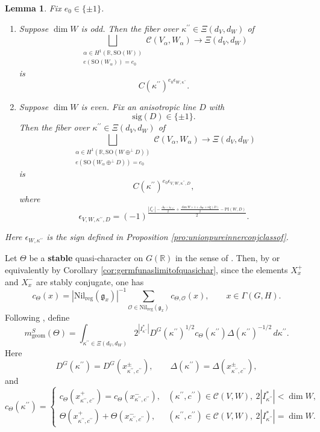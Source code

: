 \documentclass[12pt]{amsart}
\numberwithin{equation}{subsection}
\newcommand{\BR}{{\mathbb {R}}}
\newcommand{\CC}{{\mathcal {C}}}
\newcommand{\CO}{{\mathcal {O}}}
\newcommand{\Fg}{{\mathfrak {g}}}
\newcommand{\Fi}{{\mathfrak {i}}}
\newcommand{\reg}{{\mathrm{reg}}}
\newcommand{\SO}{{\mathrm{SO}}}
\def\alp{{\alpha}}
\def\Del{{\Delta}}
\def\eps{{\epsilon}}
\def\nil{\mathrm{Nil}}
\def\Gam{{\Gamma}}
\def\p{\prime}
\def\geom{\mathrm{geom}}
\def\PI{\mathrm{PI}}
\def\SO{\mathrm{SO}}
\newtheorem{lem}[thm]{Lemma}
\begin{document}
\begin{lem}\label{lem:fiberoverkappappunionoverpure}
Fix $e_0\in \{\pm 1\}$.

\begin{enumerate}
\item Suppose $\dim W$ is odd. Then the fiber over
$\kappa^{\p\p}\in \Xi(d_V,d_W)$ of
\[
\bigsqcup_{\substack{
\alp\in H^1(\BR,\SO(W))\\
e(\SO(W_\alp))=e_0
}}
\CC(V_\alp,W_\alp)
\longrightarrow
\Xi(d_V,d_W)
\]
is
\[
C(\kappa^{\p\p})^{e_0\eps_{W,\kappa^{\p\p}}}.
\]

\item Suppose $\dim W$ is even. Fix an anisotropic line $D$ with
\[
\mathrm{sig}(D)\in \{\pm 1\}.
\]
Then the fiber over $\kappa^{\p\p}\in \Xi(d_V,d_W)$ of
\[
\bigsqcup_{\substack{
\alp\in H^1(\BR,\SO(W\oplus^\perp D))\\
e(\SO(W_\alp\oplus^\perp D))=e_0
}}
\CC(V_\alp,W_\alp)
\longrightarrow
\Xi(d_V,d_W)
\]
is
\[
C(\kappa^{\p\p})^{e_0\eps_{V,W,\kappa^{\p\p},D}},
\]
where
\[
\eps_{V,W,\kappa^{\p\p},D}
=
(-1)^{
\frac{
|I^*_{\kappa^{\p\p}}|
-
\frac{\Del_V-\Fi_{V,\kappa^{\p\p}}}{2}
+
\frac{\dim W+1+\Del_W+\mathrm{sig}(D)}{2}
-
\PI(W,D)
}{2}
}.
\]
\end{enumerate}
Here $\eps_{W,\kappa^{\p\p}}$ is the sign defined in Proposition
\ref{pro:unionpureinnerconjclassof}.
\end{lem}

Let $\Theta$ be a \textbf{stable} quasi-character on $G(\BR)$ in the sense of
\cite[\S 12.1]{beuzart2015local}. Then, by \cite[(10.1.2)]{thesis_zhilin} or
equivalently by Corollary \ref{cor:germfunaslimitofquasichar}, since the
elements $X_x^+$ and $X_x^-$ are stably conjugate, one has
\[
c_\Theta(x)
=
|\nil_\reg(\Fg_x)|^{-1}
\sum_{\CO\in \nil_\reg(\Fg_x)}
c_{\Theta,\CO}(x),
\qquad x\in \Gam(G,H).
\]
Following \cite[\S 3.2]{MR3155345}, define
\begin{equation}\label{eq:stablegeomultiplicity}
m_\geom^S(\Theta)
=
\int_{\kappa^{\p\p}\in \Xi(d_V,d_W)}
2^{|I^*_{\kappa^{\p\p}}|}
D^G(\kappa^{\p\p})^{1/2}
c_\Theta(\kappa^{\p\p})
\Del(\kappa^{\p\p})^{-1/2}\,d\kappa^{\p\p}.
\end{equation}
Here
\[
D^G(\kappa^{\p\p})
=
D^G(x^\pm_{\kappa^{\p\p},c^{\p\p}}),
\qquad
\Del(\kappa^{\p\p})
=
\Del(x^\pm_{\kappa^{\p\p},c^{\p\p}}),
\]
and
\[
c_\Theta(\kappa^{\p\p})
=
\begin{cases}
c_\Theta(x^+_{\kappa^{\p\p},c^{\p\p}})
=
c_\Theta(x^-_{\kappa^{\p\p},c^{\p\p}}),
&
(\kappa^{\p\p},c^{\p\p})\in \CC(V,W),\
2|I^*_{\kappa^{\p\p}}|<\dim W,
\\[6pt]
\Theta(x^+_{\kappa^{\p\p},c^{\p\p}})
+
\Theta(x^-_{\kappa^{\p\p},c^{\p\p}}),
&
(\kappa^{\p\p},c^{\p\p})\in \CC(V,W),\
2|I^*_{\kappa^{\p\p}}|=\dim W.
\end{cases}
\]
\end{document}
